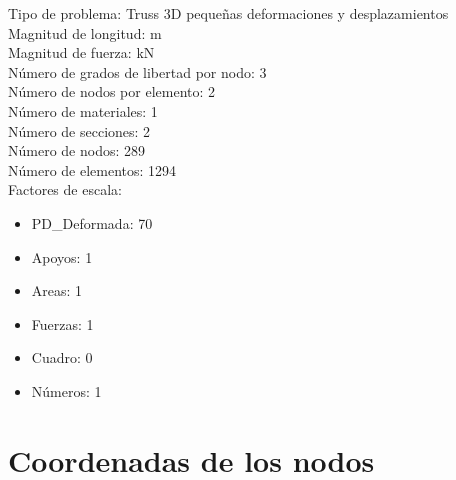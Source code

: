 \documentclass[a4paper,11pt]{article}
\begin{document}
Tipo de problema: Truss 3D pequeñas deformaciones y desplazamientos\\ 

Magnitud de longitud: m \\

Magnitud de fuerza: kN \\

Número de grados de libertad por nodo: 3 \\

Número de nodos por elemento: 2 \\

Número de materiales: 1 \\

Número de secciones: 2 \\

Número de nodos: 289 \\

Número de elementos: 1294 \\

Factores de escala: 
\begin{itemize} 
\item  PD\_Deformada: 70 
\item  Apoyos: 1 
\item  Areas: 1 
\item  Fuerzas: 1 
\item  Cuadro: 0 
\item  Números: 1 
\end{itemize} 
\newpage       

\section{Coordenadas de los nodos} 
\end{document}
